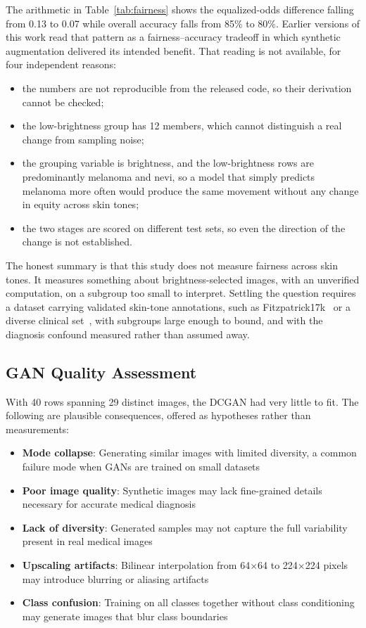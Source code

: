 \documentclass[ai,article,submit,pdftex,moreauthors]{Definitions/mdpi}
\begin{document}
The arithmetic in Table~\ref{tab:fairness} shows the equalized-odds difference falling from 0.13 to 0.07 while overall accuracy falls from 85\% to 80\%. Earlier versions of this work read that pattern as a fairness--accuracy tradeoff in which synthetic augmentation delivered its intended benefit. That reading is not available, for four independent reasons:
\begin{itemize}[leftmargin=*, itemsep=2pt]
    \item the numbers are not reproducible from the released code, so their derivation cannot be checked;
    \item the low-brightness group has 12 members, which cannot distinguish a real change from sampling noise;
    \item the grouping variable is brightness, and the low-brightness rows are predominantly melanoma and nevi, so a model that simply predicts melanoma more often would produce the same movement without any change in equity across skin tones;
    \item the two stages are scored on different test sets, so even the direction of the change is not established.
\end{itemize}

The honest summary is that this study does not measure fairness across skin tones. It measures something about brightness-selected images, with an unverified computation, on a subgroup too small to interpret. Settling the question requires a dataset carrying validated skin-tone annotations, such as Fitzpatrick17k~\cite{groh2021} or a diverse clinical set~\cite{daneshjou2022}, with subgroups large enough to bound, and with the diagnosis confound measured rather than assumed away.

\subsection{GAN Quality Assessment}

With 40 rows spanning 29 distinct images, the DCGAN had very little to fit. The following are plausible consequences, offered as hypotheses rather than measurements:
\begin{itemize}[leftmargin=*, itemsep=2pt]
    \item \textbf{Mode collapse}: Generating similar images with limited diversity, a common failure mode when GANs are trained on small datasets
    \item \textbf{Poor image quality}: Synthetic images may lack fine-grained details necessary for accurate medical diagnosis
    \item \textbf{Lack of diversity}: Generated samples may not capture the full variability present in real medical images
    \item \textbf{Upscaling artifacts}: Bilinear interpolation from 64$\times$64 to 224$\times$224 pixels may introduce blurring or aliasing artifacts
    \item \textbf{Class confusion}: Training on all classes together without class conditioning may generate images that blur class boundaries
\end{itemize}
\end{document}
